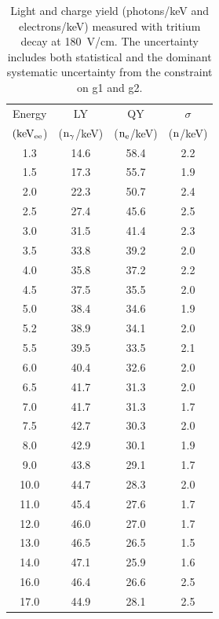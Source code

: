 \begin{table}[h!]
\centering
\begin{tabular}{|c|c|c|c|} \hline
Energy 	& 		LY	& 	QY	& $\sigma$ \\ 
$\rm (keV_{ee}$) & ($\rm n_\gamma$/keV)   & ($\rm n_e$/keV) & ($\rm n$/keV) \\ \hline
1.3 	 & 14.6 	 & 58.4 	 & 2.2 	 \\ \hline 
1.5 	 & 17.3 	 & 55.7 	 & 1.9 	 \\ \hline 
2.0 	 & 22.3 	 & 50.7 	 & 2.4 	 \\ \hline 
2.5 	 & 27.4 	 & 45.6 	 & 2.5 	 \\ \hline 
3.0 	 & 31.5 	 & 41.4 	 & 2.3 	 \\ \hline 
3.5 	 & 33.8 	 & 39.2 	 & 2.0 	 \\ \hline 
4.0 	 & 35.8 	 & 37.2 	 & 2.2 	 \\ \hline 
4.5 	 & 37.5 	 & 35.5 	 & 2.0 	 \\ \hline 
5.0 	 & 38.4 	 & 34.6 	 & 1.9 	 \\ \hline 
5.2 	 & 38.9 	 & 34.1 	 & 2.0 	 \\ \hline 
5.5 	 & 39.5 	 & 33.5 	 & 2.1 	 \\ \hline 
6.0 	 & 40.4 	 & 32.6 	 & 2.0 	 \\ \hline 
6.5 	 & 41.7 	 & 31.3 	 & 2.0 	 \\ \hline 
7.0 	 & 41.7 	 & 31.3 	 & 1.7 	 \\ \hline 
7.5 	 & 42.7 	 & 30.3 	 & 2.0 	 \\ \hline 
8.0 	 & 42.9 	 & 30.1 	 & 1.9 	 \\ \hline 
9.0 	 & 43.8 	 & 29.1 	 & 1.7 	 \\ \hline 
10.0 	 & 44.7 	 & 28.3 	 & 2.0 	 \\ \hline 
11.0 	 & 45.4 	 & 27.6 	 & 1.7 	 \\ \hline 
12.0 	 & 46.0 	 & 27.0 	 & 1.7 	 \\ \hline 
13.0 	 & 46.5 	 & 26.5 	 & 1.5 	 \\ \hline 
14.0 	 & 47.1 	 & 25.9 	 & 1.6 	 \\ \hline 
16.0 	 & 46.4 	 & 26.6 	 & 2.5 	 \\ \hline 
17.0 	 & 44.9 	 & 28.1 	 & 2.5 	 \\ \hline 
\end{tabular}
\caption{Light and charge yield (photons/keV and electrons/keV) measured with tritium decay at 180~V/cm. The uncertainty includes both statistical and the dominant systematic uncertainty from the constraint on g1 and g2.}
\label{table:Yields}
\end{table}

